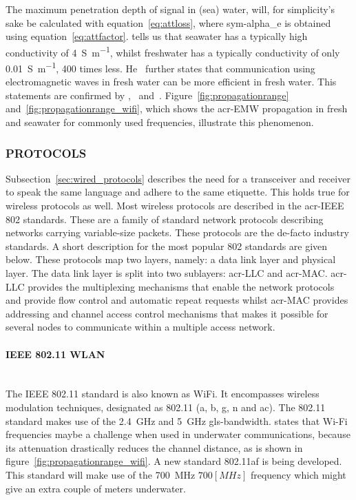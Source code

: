 The maximum penetration depth of signal in (sea) water, will, for simplicity’s sake be calculated with 
equation~\ref{eq:attloss}, where \gls{sym-alpha_e} is obtained using equation~\ref{eq:attfactor}.
\citet{jiang_electromagnetic_2011} tells us that seawater has a typically high conductivity of 
\SI{4}{\siemens\per\meter}, whilst freshwater has a typically conductivity of only \SI{0.01}{\siemens\per\meter}, 
\num{400} times less.
He~\cite{jiang_electromagnetic_2011} further states that communication using electromagnetic waves in fresh water can
be more efficient in fresh water.
This statements are confirmed by \citet{jiang_electromagnetic_2011},~\citet{ainslie_principles_2010} 
and~\citet{bogie_conduction_1972}.
Figure~\ref{fig:propagationrange} and~\ref{fig:propagationrange_wifi}, which shows the \gls{acr-EMW} propagation in 
fresh and seawater for commonly used frequencies, illustrate this phenomenon.

\subsubsection{PROTOCOLS}
Subsection~\ref{sec:wired_protocols} describes the need for a transceiver and receiver to speak the same language and
adhere to the same etiquette. This holds true for wireless protocols as well. Most wireless protocols are described 
in the \gls{acr-IEEE} 802 standards. These are a family of standard network protocols describing networks carrying 
variable-size packets. These protocols are the de-facto industry standards. A short description for the most popular 
802 standards are given below. These protocols map two layers, namely: a data link layer and physical layer. The data
link layer is split into two sublayers: \gls{acr-LLC} and \gls{acr-MAC}. \gls{acr-LLC} provides the multiplexing 
mechanisms that enable the network protocols and provide flow control and automatic repeat requests whilst 
\gls{acr-MAC} provides addressing and channel access control mechanisms that makes it possible for several nodes to 
communicate within a multiple access network.

\paragraph{IEEE 802.11 WLAN} \hfil \\
The IEEE 802.11 standard is also known as WiFi. It encompasses wireless modulation techniques, designated as 802.11 
(a, b, g, n and ac). The 802.11 standard makes use of the \SI{2.4}{\giga\hertz} and \SI{5}{\giga\hertz} 
\gls{gls-bandwidth}. \citet{freitas_evaluation_2014} states that Wi-Fi frequencies maybe a challenge when used in 
underwater communications, because its attenuation drastically reduces the channel distance, as is shown in 
figure~\ref{fig:propagationrange_wifi}. A new standard 802.11af is being developed. This standard will make use of 
the \SI{700}{\mega\hertz} $ 700 [MHz] $ frequency which might give an extra couple of meters underwater.

